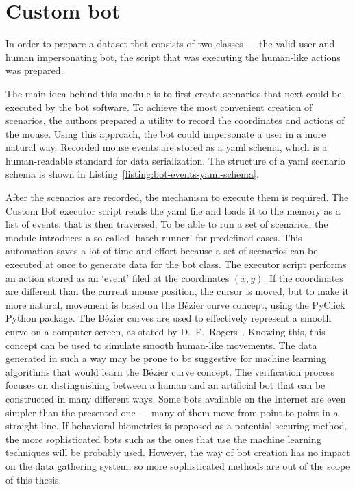 \section{Custom bot}\label{sec:custom-bot}
In order to prepare a dataset that consists of two classes --- the valid user and human impersonating bot, the script that was executing the human-like actions was prepared.

The main idea behind this module is to first create scenarios that next could be executed by the bot software.
To achieve the most convenient creation of scenarios, the authors prepared a utility to record the coordinates and actions of the mouse.
Using this approach, the bot could impersonate a user in a more natural way.
Recorded mouse events are stored as a \gls{yaml} schema, which is a human-readable standard for data serialization.
The structure of a \gls{yaml} scenario schema is shown in Listing~\ref{listing:bot-events-yaml-schema}.


After the scenarios are recorded, the mechanism to execute them is required.
The Custom Bot executor script reads the \gls{yaml} file and loads it to the memory as a list of events, that is then traversed.
To be able to run a set of scenarios, the module introduces a so-called `batch runner' for predefined cases.
This automation saves a lot of time and effort because a set of scenarios can be executed at once to generate data for the bot class.
The executor script performs an action stored as an `event' filed at the coordinates $(x, y)$.
If the coordinates are different than the current mouse position, the cursor is moved, but to make it more natural, movement is based on the Bézier curve concept, using the PyClick Python package.
The Bézier curves are used to effectively represent a smooth curve on a computer screen, as stated by \mbox{D. F. Rogers}~\cite{bezier-curves}.
Knowing this, this concept can be used to simulate smooth human-like movements.
The data generated in such a way may be prone to be suggestive for machine learning algorithms that would learn the Bézier curve concept.
The verification process focuses on distinguishing between a human and an artificial bot that can be constructed in many different ways.
Some bots available on the Internet are even simpler than the presented one --- many of them move from point to point in a straight line.
If behavioral biometrics is proposed as a potential securing method, the more sophisticated bots such as the ones that use the machine learning techniques will be probably used.
However, the way of bot creation has no impact on the data gathering system, so more sophisticated methods are out of the scope of this thesis.
